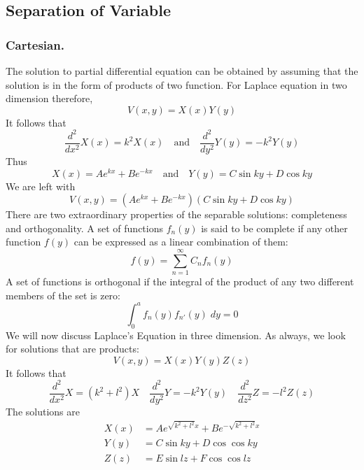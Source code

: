 \documentclass[../../../main.tex]{subfiles}
\begin{document}
\subsection*{Separation of Variable}
\subsubsection*{Cartesian.} 
The solution to partial differential equation can be obtained by assuming that the solution is in the form of products of two function. For Laplace equation in two dimension therefore,
\begin{equation*}
    V (x, y) = X (x)Y (y)
\end{equation*}
It follows that
\begin{equation*}
    \frac{d^2}{dx^2}X(x)=k^2X(x)\quad\text{and}\quad \frac{d^2}{dy^2}Y(y)=-k^2Y(y)
\end{equation*}
Thus
\begin{equation*}
    X(x)=Ae^{kx}+Be^{-kx} \quad\text{and}\quad Y(y)=C\sin ky+D \cos ky
\end{equation*}
We are left with
\begin{equation*}
    V (x, y) = (Ae^{kx}+Be^{-kx})(C\sin ky+D \cos ky)
\end{equation*}
There are two extraordinary properties of the separable solutions: completeness and orthogonality. A set of functions $f_n (y)$ is said to be complete if any other function $f (y)$ can be expressed as a linear combination of them:
\begin{equation*}
    f(y)=\sum_{n=1}^{\infty}C_nf_n (y)
\end{equation*}
A set of functions is orthogonal if the integral of the product of any two different members of the set is zero:
\begin{equation*}
    \int_{0}^{a}f_n (y)f_{n'} (y)\;dy=0
\end{equation*}
We will now discuss Laplace's Equation in three dimension. As always, we look for solutions that are products:
\begin{equation*}
    V (x, y) = X (x)Y (y)Z(z)
\end{equation*}
It follows that
\begin{equation*}
    \frac{d^2}{dx^2}X=(k^2+l^2)X \quad \frac{d^2}{dy^2}Y=-k^2Y(y) \quad \frac{d^2}{dz^2}Z=-l^2Z(z)
\end{equation*}
The solutions are
\begin{align*}
    X(x)&=Ae^{\sqrt{k^2+l^2}x}+Be^{-\sqrt{k^2+l^2}x}\\
    Y(y)&=C\sin ky+D\cos \cos ky\\
Z(z)&=E\sin lz+F\cos \cos lz
\end{align*}
\end{document}
